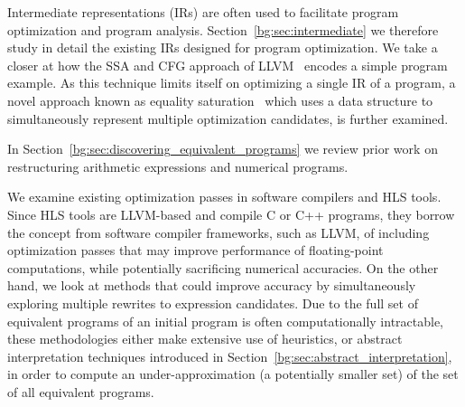 Intermediate representations (IRs) are often used to facilitate program
optimization and program analysis.  Section~\ref{bg:sec:intermediate} we
therefore study in detail the existing IRs designed for program optimization.
We take a closer at how the SSA and CFG approach of LLVM~\cite{llvm_ir}
encodes a simple program example.  As this technique limits itself on
optimizing a single IR of a program, a novel approach known as equality
saturation~\cite{tate09} which uses a data structure to simultaneously
represent multiple optimization candidates, is further examined.

In Section~\ref{bg:sec:discovering_equivalent_programs} we review prior work on
restructuring arithmetic expressions and numerical programs.

We examine existing optimization passes in software compilers and HLS
tools.  Since HLS tools are LLVM-based and compile C or C++ programs,
they borrow the concept from software compiler frameworks, such as
LLVM, of including optimization passes that may improve performance of
floating-point computations, while potentially sacrificing numerical
accuracies.  On the other hand, we look at methods that could improve accuracy
by simultaneously exploring multiple rewrites to expression candidates.
Due to the full set of equivalent programs of an initial program is often
computationally intractable, these methodologies either make extensive
use of heuristics, or abstract interpretation techniques introduced in
Section~\ref{bg:sec:abstract_interpretation}, in order to compute an
under-approximation (a potentially smaller set) of the set of all equivalent
programs.

